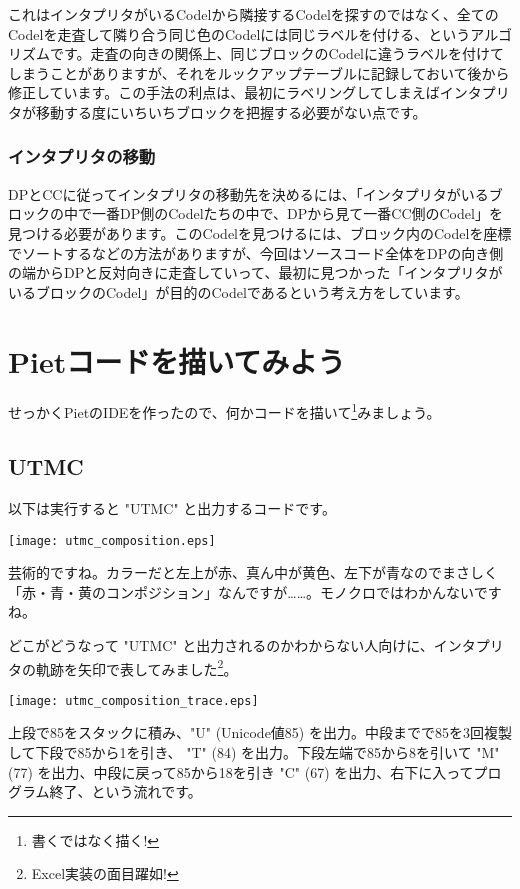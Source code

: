 これはインタプリタがいるCodelから隣接するCodelを探すのではなく、全てのCodelを走査して隣り合う同じ色のCodelには同じラベルを付ける、というアルゴリズムです。走査の向きの関係上、同じブロックのCodelに違うラベルを付けてしまうことがありますが、それをルックアップテーブルに記録しておいて後から修正しています。この手法の利点は、最初にラベリングしてしまえばインタプリタが移動する度にいちいちブロックを把握する必要がない点です。

\subsubsection{インタプリタの移動}
DPとCCに従ってインタプリタの移動先を決めるには、「インタプリタがいるブロックの中で一番DP側のCodelたちの中で、DPから見て一番CC側のCodel」を見つける必要があります。このCodelを見つけるには、ブロック内のCodelを座標でソートするなどの方法がありますが、今回はソースコード全体をDPの向き側の端からDPと反対向きに走査していって、最初に見つかった「インタプリタがいるブロックのCodel」が目的のCodelであるという考え方をしています。


\section{Pietコードを描いてみよう}
せっかくPietのIDEを作ったので、何かコードを描いて\footnote{書くではなく描く!}みましょう。
\subsection{UTMC}以下は実行すると "UTMC" と出力するコードです。

\begin{center}
	\texttt{[image: utmc\_composition.eps]}
\end{center}

芸術的ですね。カラーだと左上が赤、真ん中が黄色、左下が青なのでまさしく「赤・青・黄のコンポジション」なんですが……。モノクロではわかんないですね。

どこがどうなって "UTMC" と出力されるのかわからない人向けに、インタプリタの軌跡を矢印で表してみました\footnote{Excel実装の面目躍如!}。

\begin{center}
	\texttt{[image: utmc\_composition\_trace.eps]}
\end{center}

上段で85をスタックに積み、"U" (Unicode値85) を出力。中段までで85を3回複製して下段で85から1を引き、 "T" (84) を出力。下段左端で85から8を引いて "M" (77) を出力、中段に戻って85から18を引き "C" (67) を出力、右下に入ってプログラム終了、という流れです。

